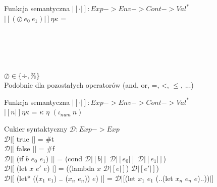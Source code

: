 \documentclass[12pt,serif]{beamer}
\begin{document}
\begin{frame}{Funkcja semantyczna}
$|[ \cdot |]: Exp -> Env -> Cont -> Val^{*}$ \newline
\\
$|[(\oslash~e_0~e_1)|] \eta \kappa$ = \\
\hspace{1em}{$|[e_0|]$ $\eta$ ($\lambda \eta_0 n_0$ .} \\
\hspace{2em}{$|[e_1|]$ $\eta$ ($\lambda \eta_1 n_1$ .} \\
 \\
 \\
 \newline
\\
$\oslash \in \{\div,\%\}$ \newline
\\
\pause
Podobnie dla pozostałych operatorów (and, or, =, <, $\leq$, ...)
\end{frame}

\begin{frame}{Funkcja semantyczna}
$|[ \cdot |]: Exp -> Env -> Cont -> Val^{*}$ \newline
\\
$|[n|] \eta \kappa$ = $\kappa$ $\eta$ $(\iota_{num}~n)$ \\
\end{frame}

\begin{frame}{Cukier syntaktyczny}
$\mathcal{D} : Exp -> Exp$ \newline
\\
$\mathcal{D}|[$ true $|]$ = \#t \\
$\mathcal{D}|[$ false $|]$ = \#f \newline
\\
$\mathcal{D}|[$ (if $b$ $e_0$ $e_1$) $|]$ =
   (cond $\mathcal{D}|[ b |]$ $\mathcal{D}|[ e_0 |]$ $\mathcal{D}|[ e_1 |]$) \newline
\\
$\mathcal{D}|[$ (let $x$ $e'$ $e$) $|]$ =
   ((lambda $x$ $\mathcal{D}|[e|]$) $\mathcal{D}|[e'|]$) \\
$\mathcal{D}|[$ (let* (($x_1$ $e_1$) .. ($x_n$ $e_n$)) $e$) $|]$ = 
   $\mathcal{D}|[$(let $x_1$ $e_1$ (..(let $x_n$ $e_n$ $e$)..))$|]$ \\
\end{frame}
\end{document}
